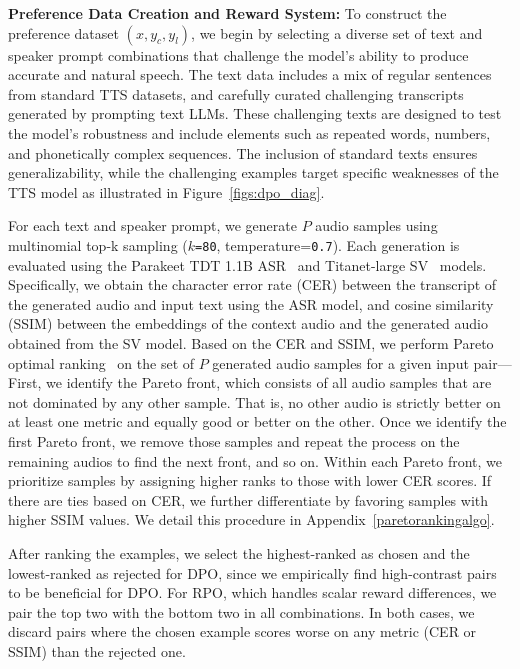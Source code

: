 \textbf{Preference Data Creation and Reward System:}
To construct the preference dataset $(x, y_c, y_l)$, we begin by selecting a diverse set of text and speaker prompt combinations that challenge the model's ability to produce accurate and natural speech. The text data includes a mix of regular sentences from standard TTS datasets, and carefully curated challenging transcripts generated by prompting text LLMs. These challenging texts are designed to test the model's robustness and include elements such as repeated words, numbers, and phonetically complex sequences. The inclusion of standard texts ensures generalizability, while the challenging examples target specific weaknesses of the TTS model as illustrated in Figure~\ref{figs:dpo_diag}. 

For each text and speaker prompt, we generate $P$ audio samples using multinomial top-k sampling ($k$\texttt{=80}, temperature=\texttt{0.7}). 
Each generation is evaluated using the Parakeet TDT 1.1B ASR~\cite{xu2023efficient} and Titanet-large SV~\cite{koluguri2022titanet} models. Specifically, we obtain the character error rate (CER) between the transcript of the generated audio and input text using the ASR model, and cosine similarity (SSIM) between the embeddings of the context audio and the generated audio obtained from the SV model. 
Based on the CER and SSIM, we perform Pareto optimal ranking~\cite{deb2011multi} on the set of $P$ generated audio samples for a given input pair---First, we identify the Pareto front, which consists of all audio samples that are not dominated by any other sample. That is, no other audio is strictly better on at least one metric and equally good or better on the other. Once we identify the first Pareto front, we remove those samples and repeat the process on the remaining audios to find the next front, and so on.
Within each Pareto front, we prioritize samples by assigning higher ranks to those with lower CER scores. If there are ties based on CER, we further differentiate by favoring samples with higher SSIM values. We detail this procedure in Appendix~\ref{paretorankingalgo}.

After ranking the examples, we select the highest-ranked as chosen and the lowest-ranked as rejected for DPO, since we empirically find high-contrast pairs to be beneficial for DPO. For RPO, which handles scalar reward differences, we pair the top two with the bottom two in all combinations. In both cases, we discard pairs where the chosen example scores worse on any metric (CER or SSIM) than the rejected one.

